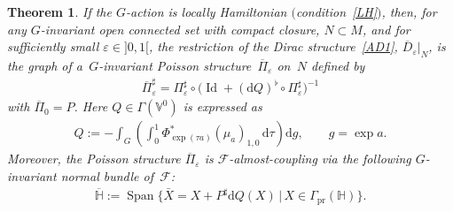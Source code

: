 \documentclass[pdftex]{sigma}
\numberwithin{equation}{section}
\newtheorem{Theorem}{Theorem}[section]
\begin{document}
\begin{Theorem}\label{teo42}
If the $G$-action is locally Hamiltonian $($condition~\eqref{LH}$)$, then, for any $G$-invariant open connected set with compact closure, $N\subset M$, and for sufficiently small $\varepsilon\in {]0,1[}$, the restriction of the Dirac structure~\eqref{AD1}, $\overline{D}_{\varepsilon}|_N$, is the graph of a~$G$-invariant Poisson structure~$\overline{\Pi}_{\varepsilon}$ on~$N$ defined by
\begin{gather}\label{AP1}
\overline{\Pi}_{\varepsilon}^{\sharp}=\Pi_{\varepsilon}^{\sharp}\circ \big(\operatorname{Id}+(\mathrm{d}Q)^{\flat}\circ\Pi_{\varepsilon}^{\sharp}\big)^{-1}
\end{gather}
with $\overline{\Pi}_{0}=P$. Here $Q\in\Gamma(\mathbb{V}^{0})$ is expressed as
\begin{gather}\label{AP2}
Q:=-\int_G \left( \int^1_0 \Phi_{\exp(\tau a)}^{\ast}(\mu_{a})_{1,0}\,\mathrm{d}\tau\right)\mathrm{d}g,\qquad g=\exp a.
\end{gather}
Moreover, the Poisson structure $\overline{\Pi}_{\varepsilon}$ is $\mathcal{F}$-almost-coupling via the following $G$-invariant normal bundle of~$\mathcal{F}$:
\begin{gather}\label{IN}
\mathbb{\overline{H}}:=\operatorname*{Span}\big\{\bar{X}=X+P^{\sharp}\mathrm{d}Q(X)\,|\, X\in\Gamma_{\operatorname*{pr}}(\mathbb{H})\big\}.
\end{gather}
\end{Theorem}
\end{document}
